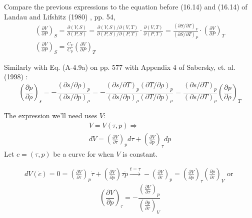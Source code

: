 \documentclass[twoside,landscape,10pt]{amsart}
\theoremstyle{plain}
\theoremstyle{definition}
\theoremstyle{remark}
\theoremstyle{remark}
\begin{document}
\begin{multicols*}{2}
Compare the previous expressions to the equation before (16.14) and (16.14) of Landau and Lifshitz (1980) \cite{LLandauELifshitz1980}, pp. 54,
\[
\begin{gathered}
\left( \frac{\partial V}{ \partial  P } \right)_S = \frac{\partial (V, S) }{ \partial (P, S)} = \frac{\partial( V,S) / \partial (V, T) }{ \partial (P, S)/ \partial (P, T)} \cdot \frac{ \partial (V, T) }{ \partial (P ,T)} = \frac{(\partial S/ \partial T)_V }{ (\partial S / \partial T)_P} \cdot \left( \frac{ \partial V}{ \partial P} \right)_T \\
\left( \frac{\partial V}{ \partial  P } \right)_S = \frac{ C_V}{ C_p} \left( \frac{\partial V}{ \partial  P } \right)_T
\end{gathered}
\]

Similarly with Eq. (A-4.9a) on pp. 577 with Appendix 4 of  Sabersky, et. al. (1998) \cite{SAHG1998}:
\[
\left( \frac{ \partial p }{ \partial \rho} \right)_s = - \frac{ (\partial s / \partial \rho)_p }{ (\partial s / \partial p)_{\rho}}  = - \frac{ (\partial s / \partial T)_p (\partial T / \partial \rho)_p }{ (\partial s / \partial p)_{\rho} (\partial T / \partial p )_{\rho}} = \frac{ (\partial s / \partial T)_p }{ (\partial s / \partial T)_{\rho}} \left( \frac{ \partial p }{ \partial \rho} \right)_T
\]

The expression we'll need uses $V$:
\[
\begin{gathered}
V = V(\tau, p) \Longrightarrow \\
dV = \left( \frac{\partial V}{\partial \tau} \right)_p d\tau + \left( \frac{\partial V}{\partial p} \right)_{\tau} dp 
\end{gathered}
\]
Let $c=(\tau, p)$  be a curve for when $V$ is constant.

\[
\begin{gathered}
dV(\dot{c}) = 0 = \left( \frac{\partial V}{\partial \tau} \right)_p \dot{\tau} + \left( \frac{\partial V}{ \partial p } \right){\tau} \dot{p} \xrightarrow{ t = \tau} - \left( \frac{\partial V}{ \partial \tau} \right)_p = \left( \frac{\partial V}{\partial p} \right)_{\tau} \left( \frac{\partial p}{\partial \tau} \right)_V \text{ or } 
\end{gathered}
\]
\begin{equation}
\left( \frac{\partial V}{\partial p} \right)_{\tau} = -\frac{\left( \frac{\partial V}{\partial \tau} \right)_p }{ \left( \frac{\partial p}{\partial \tau} \right)_V}
\end{equation}


\end{multicols*}
\end{document}
